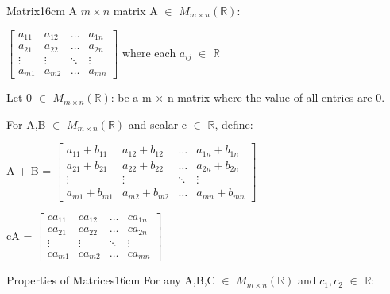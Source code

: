     \begin{definition}{Matrix}{16cm}
        A $m \times n$ {\color{lblue} matrix} A $\in$ $M_{m \times n}(\mathbb{R})$:

        \hspace{0.5cm}
        $\begin{bmatrix}
            a_{11} & a_{12} & \hdots & a_{1n} \\
            a_{21} & a_{22} & \hdots & a_{2n} \\
            \vdots & \vdots & \ddots & \vdots \\
            a_{m1} & a_{m2} & \hdots & a_{mn}
        \end{bmatrix}$
        \hspace{0.5cm}
        where each $a_{ij}$ $\in$ $\mathbb{R}$

        Let 0 $\in$ $M_{m \times n}(\mathbb{R})$:
        be a m $\times$ n matrix where the value of all entries are 0.

        For A,B $\in$ $M_{m \times n}(\mathbb{R})$
        and scalar c $\in$ $\mathbb{R}$, define:

        \hspace{0.5cm}
        A + B =
        $\begin{bmatrix}
            a_{11}+b_{11} & a_{12}+b_{12} & \hdots & a_{1n}+b_{1n} \\
            a_{21}+b_{21} & a_{22}+b_{22} & \hdots & a_{2n}+b_{2n} \\
            \vdots & \vdots & \ddots & \vdots \\
            a_{m1}+b_{m1} & a_{m2}+b_{m2} & \hdots & a_{mn}+b_{mn}
        \end{bmatrix}$

        \hspace{0.5cm}
        cA =
        $\begin{bmatrix}
            ca_{11} & ca_{12} & \hdots & ca_{1n} \\
            ca_{21} & ca_{22} & \hdots & ca_{2n} \\
            \vdots & \vdots & \ddots & \vdots \\
            ca_{m1} & ca_{m2} & \hdots & ca_{mn}
        \end{bmatrix}$
    \end{definition}

    \vspace{0.5cm}



    \begin{wtheorem}{Properties of Matrices}{16cm}
        For any A,B,C $\in$ $M_{m \times n}(\mathbb{R})$
        and $c_1,c_2$ $\in$ $\mathbb{R}$:
    \end{wtheorem}

